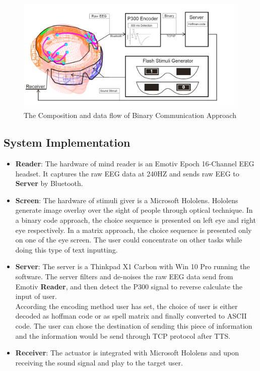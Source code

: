 \documentclass[a4paper]{article}
\begin{document}
\begin{figure}
	\centering
	\includegraphics[width=\linewidth]{Holohead_full}
	\caption{The Composition and data flow of Binary Communication Approach}
	\label{fig:holohead}
\end{figure}

\subsection{System Implementation}

\begin{itemize}
    \item \textbf {Reader}: The hardware of mind reader is an Emotiv Epoch 16-Channel EEG headset. It captures the raw EEG data at 240HZ and sends raw EEG to \textbf{Server} by Bluetooth.
    \item \textbf {Screen}: The hardware of stimuli giver is a Microsoft Hololens. Hololens generate image overlay over the sight of people through optical technique. In a binary code approach, the choice sequence is presented on left eye and right eye respectively. In a matrix approach, the choice sequence is presented only on one of the eye screen. The user could concentrate on other tasks while doing this type of text inputting.
    \item \textbf {Server}: The server is a Thinkpad X1 Carbon with Win 10 Pro running the software. The server filters and de-noises the raw EEG data send from Emotiv \textbf{Reader}, and then detect the P300 signal to reverse calculate the input of user. \\
    According the encoding method user has set, the choice of user is either decoded as hoffman code or as spell matrix and finally converted to ASCII code. The user can chose the destination of sending this piece of information and the information would be send through TCP protocol after TTS.   
    \item \textbf{Receiver}: The actuator is integrated with Microsoft Hololens and upon receiving the sound signal and play to the target user.
\end{itemize}
\end{document}
